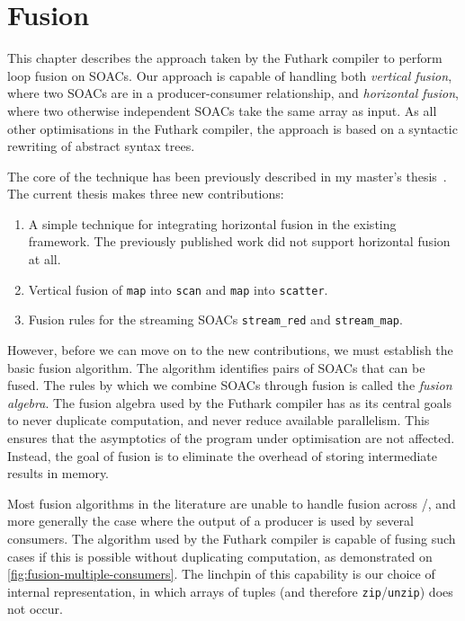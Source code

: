 \chapter{Fusion}
\label{chap:fusion}

This chapter describes the approach taken by the Futhark compiler to
perform loop fusion on SOACs.  Our approach is capable of handling
both \textit{vertical fusion}, where two SOACs are in a
producer-consumer relationship, and \textit{horizontal fusion}, where
two otherwise independent SOACs take the same array as input.  As all
other optimisations in the Futhark compiler, the approach is based on
a syntactic rewriting of abstract syntax trees.

The core of the technique has been previously described in my master's
thesis~\cite{henriksen2014exploiting}.  The current thesis makes three
new contributions:

\begin{enumerate}
\item A simple technique for integrating horizontal fusion in the
  existing framework.  The previously published work did not support
  horizontal fusion at all.
\item Vertical fusion of \lstinline{map} into \lstinline{scan} and
  \lstinline{map} into \lstinline{scatter}.
\item Fusion rules for the streaming SOACs \lstinline{stream_red} and
  \lstinline{stream_map}.
\end{enumerate}

However, before we can move on to the new contributions, we must
establish the basic fusion algorithm.  The algorithm identifies pairs
of SOACs that can be fused.  The rules by which we combine SOACs
through fusion is called the \textit{fusion algebra}.  The fusion
algebra used by the Futhark compiler has as its central goals to never
duplicate computation, and never reduce available parallelism.  This
ensures that the asymptotics of the program under optimisation are not
affected.  Instead, the goal of fusion is to eliminate the overhead of
storing intermediate results in memory.

Most fusion algorithms in the literature are unable to handle fusion
across /, and more generally the case where the
output of a producer is used by several consumers.  The algorithm used
by the Futhark compiler is capable of fusing such cases if this is
possible without duplicating computation, as demonstrated on
\cref{fig:fusion-multiple-consumers}.  The linchpin of this capability
is our choice of internal representation, in which arrays of tuples
(and therefore \lstinline{zip}/\lstinline{unzip}) does not occur.

